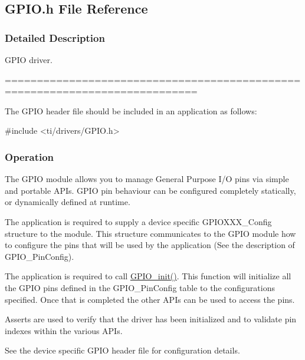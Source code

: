 \subsection{G\+P\+I\+O.\+h File Reference}
\label{_g_p_i_o_8h}


\subsubsection{Detailed Description}
G\+P\+I\+O driver. 

============================================================================

The G\+P\+I\+O header file should be included in an application as follows\+: 
\begin{DoxyCode}
\textcolor{preprocessor}{#include <ti/drivers/GPIO.h>}
\end{DoxyCode}


\subsubsection*{Operation}

The G\+P\+I\+O module allows you to manage General Purpose I/\+O pins via simple and portable A\+P\+Is. G\+P\+I\+O pin behaviour can be configured completely statically, or dynamically defined at runtime.

The application is required to supply a device specific G\+P\+I\+O\+X\+X\+X\+\_\+\+Config structure to the module. This structure communicates to the G\+P\+I\+O module how to configure the pins that will be used by the application (See the description of G\+P\+I\+O\+\_\+\+Pin\+Config).

The application is required to call \hyperlink{_g_p_i_o_8h_a7aaec489dca5ac4d278d2eb3ae38a2d2}{G\+P\+I\+O\+\_\+init()}. This function will initialize all the G\+P\+I\+O pins defined in the G\+P\+I\+O\+\_\+\+Pin\+Config table to the configurations specified. Once that is completed the other A\+P\+Is can be used to access the pins.

Asserts are used to verify that the driver has been initialized and to validate pin indexes within the various A\+P\+Is.

See the device specific G\+P\+I\+O header file for configuration details. 

